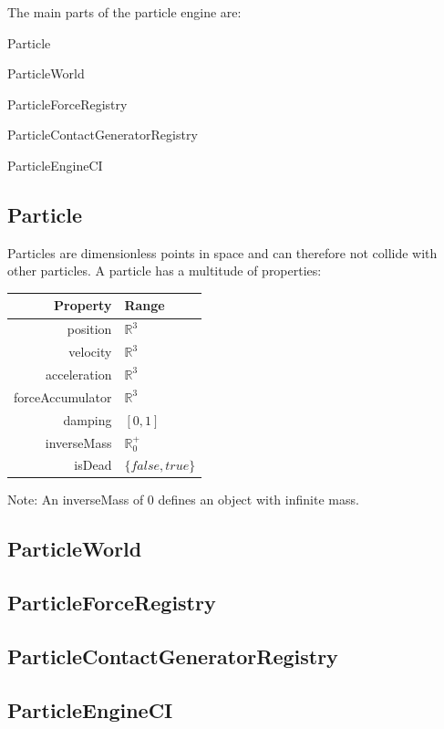\documentclass[12p, paper=a4, leqno, colorinlistoftodos]{article}
\newenvironment{packed_itemize}
{\begin{itemize}
		\setlength{\itemsep}{0pt}
		\setlength{\parskip}{0pt}
		\setlength{\parsep}{0pt}
	}{\end{itemize}}
\begin{document}
		The main parts of the particle engine are:
		\begin{packed_itemize}
			\item Particle
			\item ParticleWorld
			\item ParticleForceRegistry
			\item ParticleContactGeneratorRegistry
			\item ParticleEngineCI
		\end{packed_itemize}
		
		\subsection{Particle}
		Particles are dimensionless points in space and can therefore not collide with other particles. A particle has a multitude of properties:
		
		\begin{tabular}[H]{r | l}
			Property & Range\\
			\hline
			position & $\mathbb{R}^3$\\
			velocity & $\mathbb{R}^3$\\
			acceleration & $\mathbb{R}^3$\\
			forceAccumulator & $\mathbb{R}^3$\\
			damping & $[0, 1]$\\
			inverseMass & $\mathbb{R}^+_0$\\
			isDead & $\{false, true\}$\\
		\end{tabular}
	
		Note: An inverseMass of 0 defines an object with infinite mass.
		
		\subsection{ParticleWorld}
		
		\subsection{ParticleForceRegistry}
		
		\subsection{ParticleContactGeneratorRegistry}
		
		\subsection{ParticleEngineCI}
		
\end{document}
